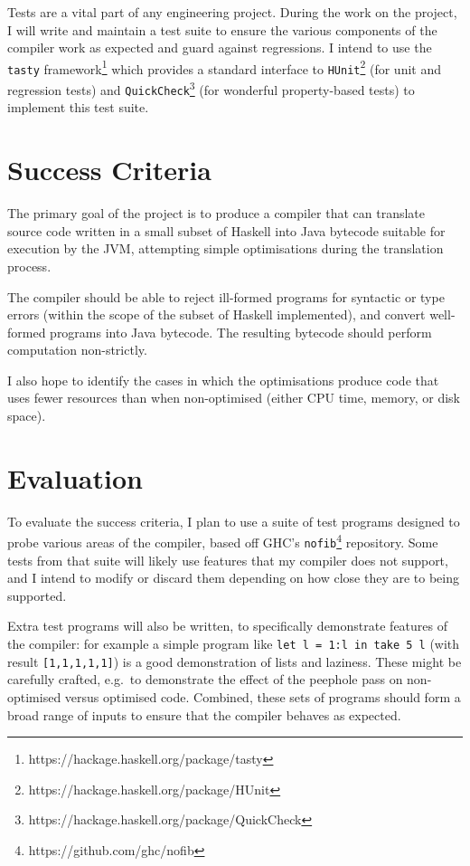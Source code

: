 \documentclass[12pt]{article}
\newcommand\haskell[1]{\texttt{#1}}
\newcommand\monospace[1]{\texttt{#1}}
\begin{document}
Tests are a vital part of any engineering project. During the work on the project, I will write and maintain a test
suite to ensure the various components of the compiler work as expected and guard against regressions. I intend to use
the \monospace{tasty} framework\footnote{https://hackage.haskell.org/package/tasty} which provides a standard interface
to \monospace{HUnit}\footnote{https://hackage.haskell.org/package/HUnit} (for unit and regression tests) and
\monospace{QuickCheck}\footnote{https://hackage.haskell.org/package/QuickCheck} (for wonderful property-based tests) to
implement this test suite.

\section*{Success Criteria}

The primary goal of the project is to produce a compiler that can translate source code written in a small subset of
Haskell into Java bytecode suitable for execution by the JVM, attempting simple optimisations during the translation
process.

The compiler should be able to reject ill-formed programs for syntactic or type errors (within the scope of the subset
of Haskell implemented), and convert well-formed programs into Java bytecode. The resulting bytecode should perform
computation non-strictly.

I also hope to identify the cases in which the optimisations produce code that uses fewer resources than when
non-optimised (either CPU time, memory, or disk space).

\section*{Evaluation}

To evaluate the success criteria, I plan to use a suite of test programs designed to probe various areas of the
compiler, based off GHC's \monospace{nofib}\footnote{https://github.com/ghc/nofib} repository. Some tests from that
suite will likely use features that my compiler does not support, and I intend to modify or discard them depending on
how close they are to being supported.

Extra test programs will also be written, to specifically demonstrate features of the compiler: for example a simple
program like \haskell{let l = 1:l in take 5 l} (with result \haskell{[1,1,1,1,1]}) is a good demonstration of lists and
laziness. These might be carefully crafted, e.g.\ to demonstrate the effect of the peephole pass on non-optimised versus
optimised code. Combined, these sets of programs should form a broad range of inputs to ensure that the compiler behaves
as expected.
\end{document}
